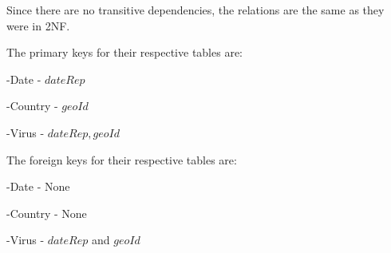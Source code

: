 \documentclass[12pt]{article}
\begin{document}



Since there are no transitive dependencies, the relations are the same as they were in 2NF.

\vspace{1em}

The primary keys for their respective tables are:

-Date - $dateRep$

-Country - $geoId$

-Virus - $dateRep, geoId$

\vspace{1em}

The foreign keys for their respective tables are:

-Date - None

-Country - None

-Virus - $dateRep$ and $geoId$

\end{document}
